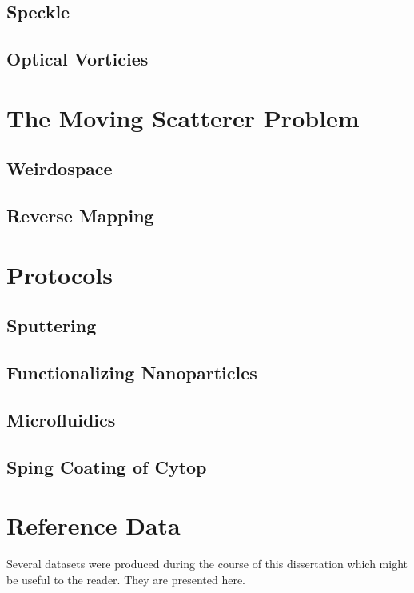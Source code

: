 \documentclass[a4paper,titlepage,onecolumn]{report}
\begin{document}
\section{Speckle}
\section{Optical Vorticies}

\chapter{The Moving Scatterer Problem}
\section{Weirdospace}
\section{Reverse Mapping}






\appendix

\chapter{Protocols}
\section{Sputtering}
\section{Functionalizing Nanoparticles}
\section{Microfluidics}
\section{Sping Coating of Cytop}

\chapter{Reference Data}
Several datasets were produced during the course of this dissertation which
might be useful to the reader.  They are presented here.
\end{document}
